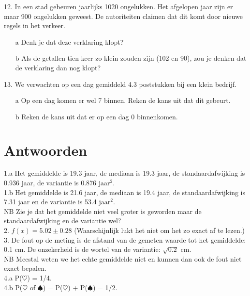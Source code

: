 12. In een stad gebeuren jaarlijks 1020 ongelukken. Het afgelopen jaar zijn er maar 900 ongelukken geweest. De autoriteiten claimen dat dit komt door nieuwe regels in het verkeer.
\begin{itemize}
\item[a] Denk je dat deze verklaring klopt?
\item[b] Als de getallen tien keer zo klein zouden zijn (102 en 90), zou je denken dat de verklaring dan nog klopt?
\end{itemize}


13. We verwachten op een dag gemiddeld 4.3 poststukken bij een klein bedrijf.
\begin{itemize}
\item[a] Op een dag komen er wel 7 binnen. Reken de kans uit dat dit gebeurt. 
\item[b] Reken de kans uit dat er op een dag 0 binnenkomen. 
\end{itemize}
  

\section{Antwoorden}
\label{/tussentoets-i/antwoorden}


1.a  Het gemiddelde is 19.3 jaar, de mediaan is 19.3 jaar, de standaardafwijking is 0.936 jaar, de variantie is 0.876 $\textrm{jaar}^2$.\\
1.b  Het gemiddelde is 21.6 jaar, de mediaan is 19.4 jaar,  
de standaardafwijking is 7.31 jaar en de variantie is 53.4 $\textrm{jaar}^2$.\\
NB Zie je dat het gemiddelde niet veel groter is geworden maar de standaardafwijking en de variantie wel?\\

2. $f(x) = 5.02 \pm 0.28$ (Waarschijnlijk lukt het niet om het zo exact af te lezen.)\\


3. De fout op de meting is de afstand van de gemeten waarde tot het gemiddelde: 0.1 cm. De onzekerheid is de wortel van de variantie: $\sqrt{0.2}$ cm.\\
NB Meestal weten we het echte gemiddelde niet en kunnen dan ook de fout niet exact bepalen.\\


4.a P($\heartsuit$) = 1/4.\\
4.b P($\heartsuit$ of $\spadesuit$) = P($\heartsuit$) + P($\spadesuit$) = 1/2.\\


